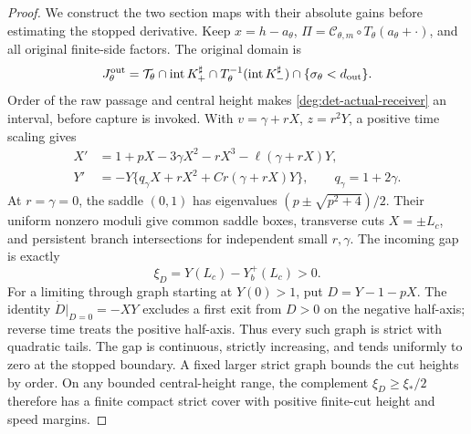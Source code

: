 \begin{proof}
We construct the two section maps with their absolute gains before
estimating the stopped derivative. Keep \(x=h-a_\theta\), \(\Pi=\mathcal C_{\theta,m}\circ
T_\theta(a_\theta+\cdot)\), and all original finite-side factors.
The original domain is
\[
 J_\theta^{\rm out}=\mathcal T_\theta\cap\operatorname{int}K_+^\sharp
 \cap T_\theta^{-1}(\operatorname{int}K_-^\sharp)
 \cap\{\sigma_\theta<d_{\rm out}\}.
\]
Order of the raw passage and central height makes
\eqref{deg:det-actual-receiver} an interval, before capture is invoked.
With \(v=\gamma+rX\), \(z=r^2Y\), a positive time scaling gives
\begin{equation}\label{deg:det-field}
 \begin{split}
 X'&=1+pX-3\gamma X^2-rX^3-\ell(\gamma+rX)Y,\\
 Y'&=-Y\{q_\gamma X+rX^2+Cr(\gamma+rX)Y\},\qquad q_\gamma=1+2\gamma.
 \end{split}
\end{equation}
At \(r=\gamma=0\), the saddle \((0,1)\) has eigenvalues
\((p\pm\sqrt{p^2+4})/2\). Their uniform nonzero moduli give common
saddle boxes, transverse cuts \(X=\pm L_c\), and persistent branch
intersections for independent small \(r,\gamma\).
The incoming gap is exactly
\begin{equation}\label{deg:det-actual-gap}
 \xi_D=Y(L_c)-Y_b^+(L_c)>0.
\end{equation}
For a limiting through graph starting at \(Y(0)>1\), put
\(D=Y-1-pX\). The identity \(\dot D|_{D=0}=-XY\) excludes a
first exit from \(D>0\) on the negative half-axis; reverse time treats
the positive half-axis. Thus every such graph is strict with quadratic
tails. The gap is continuous, strictly increasing, and tends uniformly
to zero at the stopped boundary. A fixed larger strict graph bounds the
cut heights by order. On any bounded central-height range, the complement
\(\xi_D\ge\xi_*/2\) therefore has a finite compact strict cover with
positive finite-cut height and speed margins.


\end{proof}
